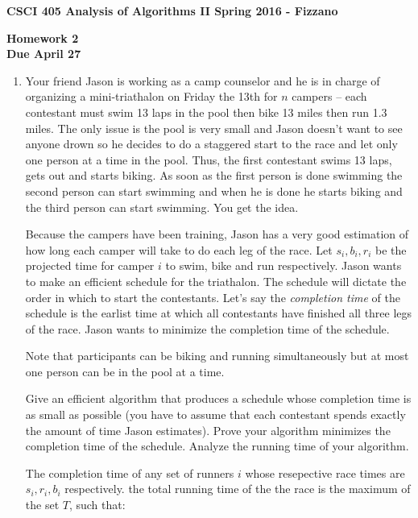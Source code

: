 \documentclass[11pt]{article}
\begin{document}
\textbf{CSCI 405 Analysis of Algorithms II \hfill Spring 2016 - Fizzano}

\begin{center}
\textbf{Homework 2 \\  Due April 27}
\end{center}

\begin{enumerate}[1.]



\item Your friend Jason is working as a camp counselor and he is in charge of organizing a mini-triathalon on Friday the 13th for $n$ campers -- each contestant must swim 13 laps in the pool then bike 13 miles then run 1.3 miles.  The only issue is the pool is very small and Jason doesn't want to see anyone drown so he decides to do a staggered start to the race and let only one person at a time in the pool.  Thus, the first contestant swims 13 laps, gets out and starts biking.  As soon as the first person is done swimming the second person can start swimming and when he is done he starts biking and the third person can start swimming.  You get the idea.  

Because the campers have been training, Jason has a very good estimation of how long each camper will take to do each leg of the race.  Let $s_i, b_i, r_i$ be the projected time for camper $i$ to swim, bike and run respectively.  Jason wants to make an efficient schedule for the triathalon.  The schedule will dictate the order in which to start the contestants.   Let's say the {\em completion time} of the schedule is the earlist time at which all contestants have finished all three legs of the race.  Jason wants to minimize the completion time of the schedule.  

Note that participants can be biking and running simultaneously but at most one person can be in the pool at a time.  

Give an efficient algorithm that produces a schedule whose completion time is as small as possible (you have to assume that each contestant spends exactly the amount of time Jason estimates).  Prove your algorithm minimizes the completion time of the schedule.  Analyze the running time of your algorithm.  

The completion time of any set of runners $i$ whose resepective race times are $s_i, r_i, b_i$ respectively.  the total running time of the the race is the maximum of the set $T$, such that:


\end{enumerate}
\end{document}
